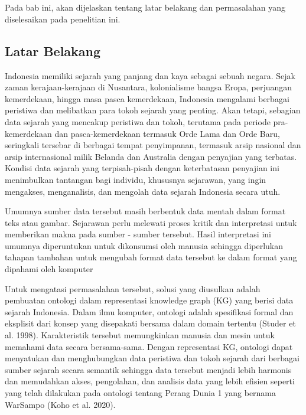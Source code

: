 \chapter{\babSatu}
\label{bab:1}
Pada bab ini, akan dijelaskan tentang latar belakang dan permasalahan yang diselesaikan pada penelitian ini.


\section{Latar Belakang}
\label{sec:latarBelakang}
Indonesia memiliki sejarah yang panjang dan kaya sebagai sebuah negara. Sejak zaman kerajaan-kerajaan di Nusantara, kolonialisme bangsa Eropa, perjuangan kemerdekaan, hingga masa pasca kemerdekaan, Indonesia mengalami berbagai peristiwa dan melibatkan para tokoh sejarah yang penting. Akan tetapi, sebagian data sejarah yang mencakup peristiwa dan tokoh, terutama pada periode pra-kemerdekaan dan pasca-kemerdekaan termasuk Orde Lama dan Orde Baru, seringkali tersebar di berbagai tempat penyimpanan, termasuk arsip nasional dan arsip internasional milik Belanda dan Australia dengan penyajian yang terbatas. Kondisi data sejarah yang terpisah-pisah dengan keterbatasan penyajian ini menimbulkan tantangan bagi individu, khususnya sejarawan, yang ingin mengakses, menganalisis, dan mengolah data sejarah Indonesia secara utuh.

Umumnya sumber data tersebut masih berbentuk data mentah dalam format teks atau gambar. Sejarawan perlu melewati proses kritik dan interpretasi untuk memberikan makna pada sumber - sumber tersebut. Hasil interpretasi ini umumnya diperuntukan untuk dikonsumsi oleh manusia sehingga diperlukan tahapan tambahan untuk mengubah format data tersebut ke dalam format yang dipahami oleh komputer

Untuk mengatasi permasalahan tersebut, solusi yang diusulkan adalah pembuatan ontologi dalam representasi knowledge graph (KG) yang berisi data sejarah Indonesia. Dalam ilmu komputer, ontologi adalah spesifikasi formal dan eksplisit dari konsep yang disepakati bersama dalam domain tertentu (Studer et al. 1998). Karakteristik tersebut memungkinkan manusia dan mesin untuk memahami data secara bersama-sama. Dengan representasi KG, ontologi dapat menyatukan dan menghubungkan data peristiwa dan tokoh sejarah dari berbagai sumber sejarah secara semantik sehingga data tersebut menjadi lebih harmonis dan memudahkan akses, pengolahan, dan analisis data yang lebih efisien seperti yang telah dilakukan pada ontologi tentang Perang Dunia 1 yang bernama WarSampo (Koho et al. 2020).

